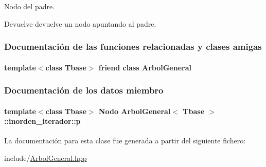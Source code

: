 Nodo del padre. 

\begin{DoxyReturn}{Devuelve}
devuelve un nodo apuntando al padre. 
\end{DoxyReturn}


\subsubsection{Documentación de las funciones relacionadas y clases amigas}
\hypertarget{classArbolGeneral_1_1inorden__iterador_a9c06e31b7c3e0d4ee5b03003d32935a5}{
\paragraph[{Arbol\-General}]{\setlength{\rightskip}{0pt plus 5cm}template$<$class Tbase$>$ friend class {\bf Arbol\-General}\hspace{0.3cm}{\ttfamily [friend]}}}\label{classArbolGeneral_1_1inorden__iterador_a9c06e31b7c3e0d4ee5b03003d32935a5}


\subsubsection{Documentación de los datos miembro}
\hypertarget{classArbolGeneral_1_1inorden__iterador_a77d9424a41cf406909fe131c11ccc856}{
\paragraph[{p}]{\setlength{\rightskip}{0pt plus 5cm}template$<$class Tbase$>$ {\bf Nodo} {\bf Arbol\-General}$<$ Tbase $>$\-::inorden\-\_\-iterador\-::p\hspace{0.3cm}{\ttfamily [private]}}}\label{classArbolGeneral_1_1inorden__iterador_a77d9424a41cf406909fe131c11ccc856}


La documentación para esta clase fue generada a partir del siguiente fichero\-:\begin{DoxyCompactItemize}
\item 
include/\hyperlink{ArbolGeneral_8hpp}{Arbol\-General.\-hpp}\end{DoxyCompactItemize}
